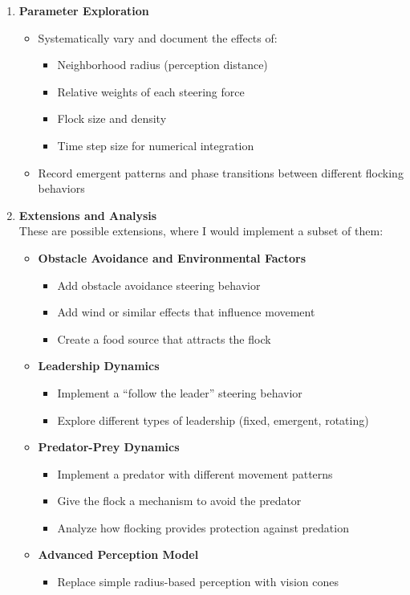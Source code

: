 \begin{enumerate}
	\item \textbf{Parameter Exploration}
	      \begin{itemize}
		      \item Systematically vary and document the effects of:
		            \begin{itemize}
			            \item Neighborhood radius (perception distance)
			            \item Relative weights of each steering force
			            \item Flock size and density
			            \item Time step size for numerical integration
		            \end{itemize}
		      \item Record emergent patterns and phase transitions between different flocking behaviors
	      \end{itemize}
	\item \textbf{Extensions and Analysis}\\
	      These are possible extensions, where I would implement a subset of them:
	      \begin{itemize}
		      \item \textbf{Obstacle Avoidance and Environmental Factors}
		            \begin{itemize}
			            \item Add obstacle avoidance steering behavior
			            \item Add wind or similar effects that influence movement
			            \item Create a food source that attracts the flock
		            \end{itemize}
		      \item \textbf{Leadership Dynamics}
		            \begin{itemize}
			            \item Implement a ``follow the leader'' steering behavior
			            \item Explore different types of leadership (fixed, emergent, rotating)
		            \end{itemize}
		      \item \textbf{Predator-Prey Dynamics}
		            \begin{itemize}
			            \item Implement a predator with different movement patterns
			            \item Give the flock a mechanism to avoid the predator
			            \item Analyze how flocking provides protection against predation
		            \end{itemize}
		      \item \textbf{Advanced Perception Model}
		            \begin{itemize}
			            \item Replace simple radius-based perception with vision cones
		            \end{itemize}
	      \end{itemize}
\end{enumerate}
